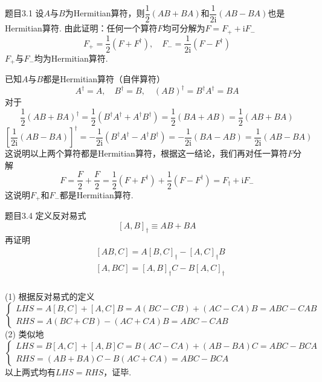 \begin{question}{题目3.1}
    设$A$与$B$为Hermitian算符，则$\dfrac{1}{2}(AB+BA)$和$\dfrac{1}{2\mathrm{i}}(AB-BA)$也是Hermitian算符. 由此证明：任何一个算符$F$均可分解为$F=F_{+}+\mathrm{i}F_{-}$
    $$
        F_{+}=\frac{1}{2}(F+F^{\dagger}),\quad
        F_{-}=\frac{1}{2\mathrm{i}}(F-F^{\dagger})
    $$
    $F_{+}$与$F_{-}$均为Hermitian算符.
\end{question}
\begin{solution}
    已知$A$与$B$都是Hermitian算符（自伴算符）
    $$
        A^\dagger = A, \quad
        B^\dagger = B, \quad
        (AB)^{\dagger}=B^{\dagger}A^{\dagger}=BA
    $$
    对于
    $$
        \frac{1}{2}(AB+BA)^\dagger
        = \frac{1}{2}\left(B^\dagger A^\dagger + A^\dagger B^\dagger\right)
        = \frac{1}{2}(BA+AB)
        = \frac{1}{2}(AB+BA)
    $$
    $$
        \left[\frac{1}{2\mathrm{i}}(AB-BA)\right]^\dagger
        = -\frac{1}{2\mathrm{i}}\left(B^{\dagger}A^{\dagger} - A^{\dagger}B^{\dagger}\right)
        = -\frac{1}{2\mathrm{i}}\left(BA-AB\right)
        = \frac{1}{2\mathrm{i}}\left(AB-BA\right)
    $$
    这说明以上两个算符都是Hermitian算符，根据这一结论，我们再对任一算符$F$分解
    $$
        F = \frac{F}{2}+\frac{F}{2}
        = \frac{1}{2}\left(F+F^\dagger\right)+\frac{1}{2}\left(F-F^\dagger\right)
        = F_{\dagger}+\mathrm{i}F_{-}
    $$
    这说明$F_{+}$和$F_{-}$都是Hermitian算符.
\end{solution}



\begin{question}{题目3.4}
    定义反对易式
    $$
        [A, B]_{\dagger} \equiv AB+BA
    $$
    再证明
    $$
        \begin{aligned}
             & [AB, C] = A[B, C]_{\dagger} - [A, C]_{\dagger}B \\
             & [A, BC] = [A, B]_{\dagger}C - B[A, C]_{\dagger} \\
        \end{aligned}
    $$
\end{question}
\begin{solution}
    (1) 根据反对易式的定义
    $$
        \begin{cases}
            LHS=A[B,C]+[A,C]B=A(BC-CB)+(AC-CA)B=ABC-CAB \\
            RHS=A(BC+CB)-(AC+CA)B=ABC-CAB
        \end{cases}
    $$
    (2) 类似地
    $$
        \begin{cases}
            LHS=B[A,C]+[A,B]C=B(AC-CA)+(AB-BA)C=ABC-BCA \\
            RHS=(AB+BA)C-B(AC+CA)=ABC-BCA
        \end{cases}
    $$
    以上两式均有$LHS=RHS$，证毕.
\end{solution}

